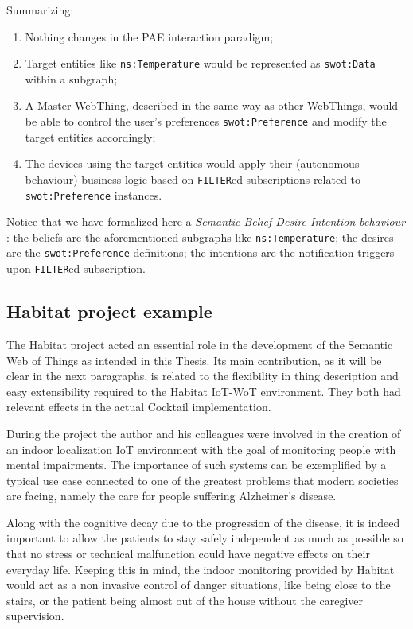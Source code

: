 Summarizing:
\begin{enumerate}
\item Nothing changes in the PAE interaction paradigm;
\item Target entities like \texttt{ns:Temperature} would be represented as \texttt{swot:Data} within a subgraph;
\item A Master WebThing, described in the same way as other WebThings, would be able to control the user's preferences \texttt{swot:Preference} and modify the target entities accordingly;
\item The devices using the target entities would apply their (autonomous behaviour) business logic based on \texttt{FILTER}ed subscriptions related to \texttt{swot:Preference} instances.
\end{enumerate}

Notice that we have formalized here a \textit{Semantic Belief-Desire-Intention behaviour} \cite{challenger2018development}: the beliefs are the aforementioned subgraphs like \texttt{ns:Temperature}; the desires are the \texttt{swot:Preference} definitions; the intentions are the notification triggers upon \texttt{FILTER}ed subscription.

\subsection{Habitat project example}
The Habitat project acted an essential role in the development of the Semantic Web of Things as intended in this Thesis. Its main contribution, as it will be clear in the next paragraphs, is related to the flexibility in thing description and easy extensibility required to the Habitat IoT-WoT environment. They both had relevant effects in the actual Cocktail implementation.

During the project the author and his colleagues were involved in the creation of an indoor localization IoT environment with the goal of monitoring people with mental impairments. The importance of such systems can be exemplified by a typical use case connected to one of the greatest problems that modern societies are facing, namely the care for people suffering Alzheimer's disease. 

Along with the cognitive decay due to the progression of the disease, it is indeed important to allow the patients to stay safely independent as much as possible so that no stress or technical malfunction could have negative effects on their everyday life. Keeping this in mind, the indoor monitoring provided by Habitat would act as a non invasive control of danger situations, like being close to the stairs, or the patient being almost out of the house without the caregiver supervision.

